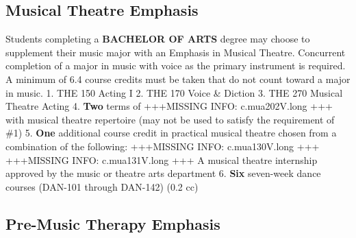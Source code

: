 \documentclass[
  letterpaper,
]{scrbook}
\begin{document}
\hypertarget{musical-theatre-emphasis}{%
\subsection{Musical Theatre Emphasis}\label{musical-theatre-emphasis}}

Students completing a \textbf{BACHELOR OF ARTS} degree may choose to
supplement their music major with an Emphasis in Musical Theatre.
Concurrent completion of a major in music with voice as the primary
instrument is required. A minimum of 6.4 course credits must be taken
that do not count toward a major in music. 1. THE 150 Acting I 2. THE
170 Voice \& Diction 3. THE 270 Musical Theatre Acting 4. \textbf{Two}
terms of +++MISSING INFO: c.mua202V.long +++ with musical theatre
repertoire (may not be used to satisfy the requirement of \#1) 5.
\textbf{One} additional course credit in practical musical theatre
chosen from a combination of the following: +++MISSING INFO:
c.mua130V.long +++ +++MISSING INFO: c.mua131V.long +++ A musical theatre
internship approved by the music or theatre arts department 6.
\textbf{Six} seven-week dance courses (DAN-101 through DAN-142) (0.2 cc)

\hypertarget{pre-music-therapy-emphasis}{%
\subsection{Pre-Music Therapy
Emphasis}\label{pre-music-therapy-emphasis}}
\end{document}
